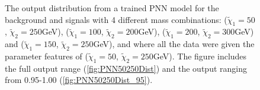 \begin{figure}
    \caption{The output distribution from a trained \ac{PNN} model for the background and signals with 4 different mass combinations:
    ($\tilde{\chi}_1=50$, $\tilde{\chi}_2=250$GeV), ($\tilde{\chi}_1=100$, $\tilde{\chi}_2=200$GeV), 
    ($\tilde{\chi}_1=200$, $\tilde{\chi}_2=300$GeV) and ($\tilde{\chi}_1=150$, $\tilde{\chi}_2=250$GeV), and where all the data were given the 
    parameter features of ($\tilde{\chi}_1=50$, $\tilde{\chi}_2=250$GeV). The figure includes the full output range (\ref{fig:PNN50250Dist}) 
    and the output ranging from 0.95-1.00 (\ref{fig:PNN50250Dist_95}).}
    \label{fig:PNN50250}
\end{figure}
